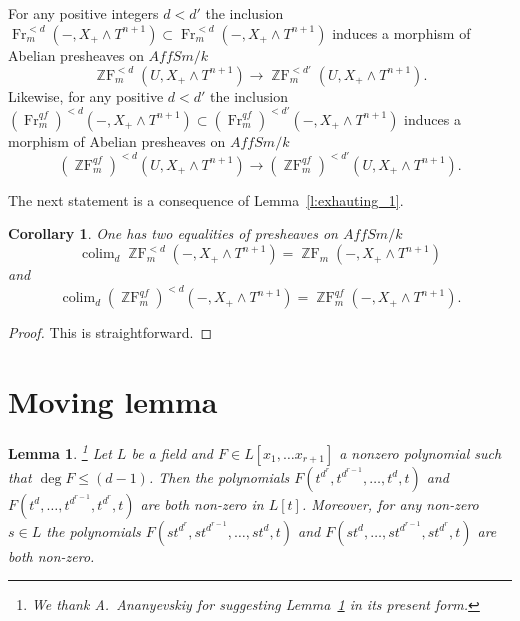 \documentclass[a4paper,11pt,reqno]{amsart}
\newtheorem{lemma}[theorem]{Lemma}
\newtheorem{corollary}[theorem]{Corollary}
\begin{document}
For any positive integers $d < d'$ the inclusion
${\operatorname{Fr}}_m^{<d}(-,X_+\wedge T^{n+1})\subset {\operatorname{Fr}}_m^{<d}(-,X_+\wedge
T^{n+1})$ induces a morphism of Abelian presheaves on $AffSm/k$
   $${\operatorname{\mathbb{Z}F}}_m^{<d}(U,X_+\wedge T^{n+1})\to {\operatorname{\mathbb{Z}F}}_m^{<d'}(U,X_+\wedge T^{n+1}).$$
Likewise, for any positive $d < d'$ the inclusion
$({\operatorname{Fr}}^{qf}_m)^{<d}(-,X_+\wedge T^{n+1})\subset
({\operatorname{Fr}}^{qf}_m)^{<d'}(-,X_+\wedge T^{n+1})$ induces a morphism of
Abelian presheaves on $AffSm/k$
   $$({\operatorname{\mathbb{Z}F}}^{qf}_m)^{<d}(U,X_+\wedge T^{n+1})\to ({\operatorname{\mathbb{Z}F}}^{qf}_m)^{<d'}(U,X_+\wedge T^{n+1}).$$

The next statement is a consequence of Lemma~\ref{l:exhauting_1}.

\begin{corollary}\label{cor:exhauting_2}
One has two equalities of presheaves on $AffSm/k$
   $$\operatorname{colim}_{d} {\operatorname{\mathbb{Z}F}}_m^{<d}(-,X_+\wedge T^{n+1})={\operatorname{\mathbb{Z}F}}_m(-,X_+\wedge T^{n+1})$$
and
   $$\operatorname{colim}_{d} ({\operatorname{\mathbb{Z}F}}^{qf}_m)^{<d}(-,X_+\wedge T^{n+1})={\operatorname{\mathbb{Z}F}}^{qf}_m(-,X_+\wedge T^{n+1}).$$
\end{corollary}

\begin{proof}
This is straightforward.
\end{proof}

\section{Moving lemma}\label{mlemma}

\begin{lemma}\label{lem:tnonzero}\footnote{We thank A.~Ananyevskiy for suggesting Lemma~\ref{lem:tnonzero}
in its present form.} Let $L$ be a field and $F\in L[x_1,\ldots
x_{r+1}]$ a nonzero polynomial such that $\deg F\leqslant (d-1)$.
Then the polynomials $F(t^{d^r},t^{d^{r-1}},\ldots, t^d,t)$ and
$F(t^d,\ldots,t^{d^{r-1}},t^{d^r},t)$ are both non-zero in $L[t]$.
Moreover, for any non-zero $s \in L$ the polynomials
$F(st^{d^r},st^{d^{r-1}},\ldots, st^d,t)$ and
$F(st^d,\ldots,st^{d^{r-1}},st^{d^r},t)$ are both non-zero.
\end{lemma}
\end{document}

